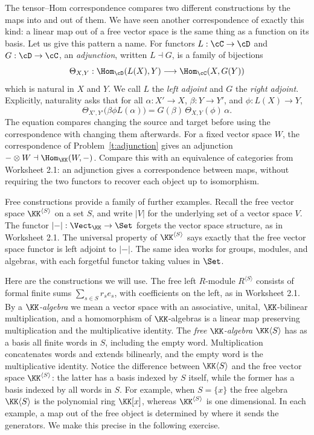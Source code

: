 \documentclass[12pt,reqno]{amsart}
\begin{document}
\hrulefill

The tensor--Hom correspondence compares two different constructions by the maps into and out of them. We have seen another correspondence of exactly this kind: a linear map out of a free vector space is the same thing as a function on its basis. Let us give this pattern a name. For functors $L:\cC\to\cD$ and $G:\cD\to\cC$, an \emph{adjunction}, written $L\dashv G$, is a family of bijections
\[
\Theta_{X,Y}:\Hom_{\cD}(L(X),Y)\longrightarrow\Hom_{\cC}(X,G(Y))
\]
which is natural in $X$ and $Y$. We call $L$ the \emph{left adjoint} and $G$ the \emph{right adjoint}. Explicitly, naturality asks that for all $\alpha:X'\to X$, $\beta:Y\to Y'$, and $\phi:L(X)\to Y$,
\[
\Theta_{X',Y'}\big(\beta\phi L(\alpha)\big)
=G(\beta)\,\Theta_{X,Y}(\phi)\,\alpha.
\]
The equation compares changing the source and target before using the correspondence with changing them afterwards. For a fixed vector space $W$, the correspondence of Problem~\ref{t:adjunction} gives an adjunction $-\otimes W\dashv\Hom_{\KK}(W,-)$. Compare this with an equivalence of categories from Worksheet 2.1: an adjunction gives a correspondence between maps, without requiring the two functors to recover each object up to isomorphism.

Free constructions provide a family of further examples. Recall the free vector space $\KK^{\langle S\rangle}$ on a set $S$, and write $|V|$ for the underlying set of a vector space $V$. The functor $|{-}|:\Vect_{\KK}\to\Set$ forgets the vector space structure, as in Worksheet 2.1. The universal property of $\KK^{\langle S\rangle}$ says exactly that the free vector space functor is left adjoint to $|{-}|$. The same idea works for groups, modules, and algebras, with each forgetful functor taking values in $\Set$.

Here are the constructions we will use. The free left $R$-module $R^{\langle S\rangle}$ consists of formal finite sums $\sum_{s\in S}r_se_s$, with coefficients on the left, as in Worksheet 2.1. By a \emph{$\KK$-algebra} we mean a vector space with an associative, unital, $\KK$-bilinear multiplication, and a homomorphism of $\KK$-algebras is a linear map preserving multiplication and the multiplicative identity. The \emph{free $\KK$-algebra} $\KK\langle S\rangle$ has as a basis all finite words in $S$, including the empty word. Multiplication concatenates words and extends bilinearly, and the empty word is the multiplicative identity. Notice the difference between $\KK\langle S\rangle$ and the free vector space $\KK^{\langle S\rangle}$: the latter has a basis indexed by $S$ itself, while the former has a basis indexed by all words in $S$. For example, when $S=\{x\}$ the free algebra $\KK\langle S\rangle$ is the polynomial ring $\KK[x]$, whereas $\KK^{\langle S\rangle}$ is one dimensional. In each example, a map out of the free object is determined by where it sends the generators. We make this precise in the following exercise.
\end{document}

